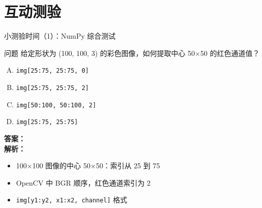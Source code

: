 
\section{互动测验}

\begin{frame}[fragile]{小测验时间（1）：NumPy 综合测试}
	\begin{block}{问题}
		给定形状为 (100, 100, 3) 的彩色图像，如何提取中心 50×50 的红色通道值？
		\begin{enumerate}[(A)]
			\item \texttt{img[25:75, 25:75, 0]}
			\item \texttt{img[25:75, 25:75, 2]}
			\item \texttt{img[50:100, 50:100, 2]}
			\item \texttt{img[25:75, 25:75]}
		\end{enumerate}
	\end{block}
	\pause
	\textbf{答案：}  \\
	\vspace{0.2cm}
	\textbf{解析：}
	\begin{itemize}
		\item 100×100 图像的中心 50×50：索引从 25 到 75
		\item OpenCV 中 BGR 顺序，红色通道索引为 2
		\item \texttt{img[y1:y2, x1:x2, channel]} 格式
	\end{itemize}
\end{frame}



